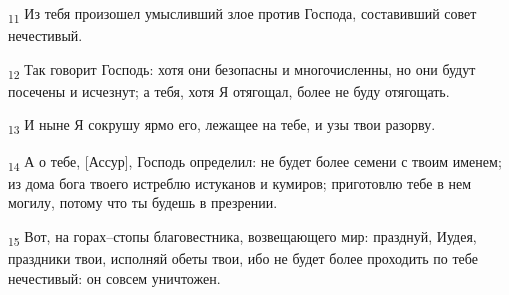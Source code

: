 \begin{tcolorbox}
\textsubscript{11} Из тебя произошел умысливший злое против Господа, составивший совет нечестивый.
\end{tcolorbox}
\begin{tcolorbox}
\textsubscript{12} Так говорит Господь: хотя они безопасны и многочисленны, но они будут посечены и исчезнут; а тебя, хотя Я отягощал, более не буду отягощать.
\end{tcolorbox}
\begin{tcolorbox}
\textsubscript{13} И ныне Я сокрушу ярмо его, лежащее на тебе, и узы твои разорву.
\end{tcolorbox}
\begin{tcolorbox}
\textsubscript{14} А о тебе, [Ассур], Господь определил: не будет более семени с твоим именем; из дома бога твоего истреблю истуканов и кумиров; приготовлю тебе в нем могилу, потому что ты будешь в презрении.
\end{tcolorbox}
\begin{tcolorbox}
\textsubscript{15} Вот, на горах--стопы благовестника, возвещающего мир: празднуй, Иудея, праздники твои, исполняй обеты твои, ибо не будет более проходить по тебе нечестивый: он совсем уничтожен.
\end{tcolorbox}
